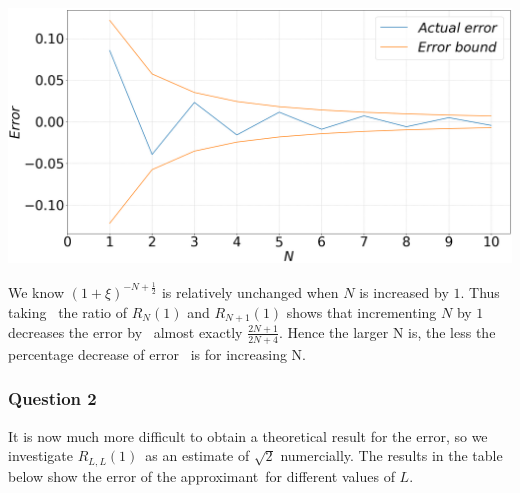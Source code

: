 \documentclass[12pt, a4paper]{article}
\begin{document}
\vspace{0.3cm}
\begin{minipage}{\textwidth}
	\includegraphics[width=\linewidth]{q1_fig2}
	\label{q1_fig2}
\end{minipage}
\vspace{0.1cm}

We know $(1+\xi)^{-N + \frac{1}{2}}$ is relatively unchanged when $N$ is increased by $1$. Thus taking \
the ratio of $R_{N}(1)$ and $R_{N+1}(1)$ shows that incrementing $N$ by $1$ decreases the error by \
almost exactly $\frac{ 2N+1 }{ 2N+4 }$. Hence the larger N is, the less the percentage decrease of error \
is for increasing N.


\subsubsection*{Question 2}

It is now much more difficult to obtain a theoretical result for the error, so we investigate $R_{L,L}(1)$\
as an estimate of $\sqrt{2}$ numercially. The results in the table below show the error of the approximant\
for different values of $L$.
\vspace{0.3cm}
\end{document}
